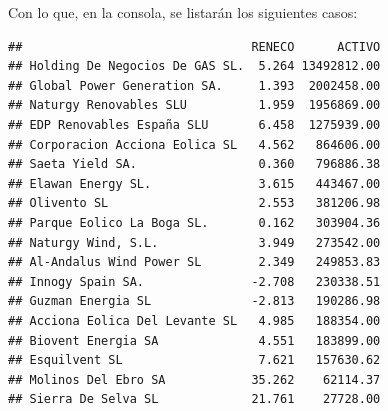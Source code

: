\documentclass[
]{book}
\newenvironment{Shaded}{\begin{snugshade}}{\end{snugshade}}
\newcommand{\FloatTok}[1]{\textcolor[rgb]{0.00,0.00,0.81}{#1}}
\newcommand{\FunctionTok}[1]{\textcolor[rgb]{0.13,0.29,0.53}{\textbf{#1}}}
\newcommand{\NormalTok}[1]{#1}
\newcommand{\OtherTok}[1]{\textcolor[rgb]{0.56,0.35,0.01}{#1}}
\newcommand{\SpecialCharTok}[1]{\textcolor[rgb]{0.81,0.36,0.00}{\textbf{#1}}}
\begin{document}
\begin{Shaded}
\end{Shaded}

Con lo que, en la consola, se listarán los siguientes casos:

\begin{verbatim}
##                                RENECO      ACTIVO
## Holding De Negocios De GAS SL.  5.264 13492812.00
## Global Power Generation SA.     1.393  2002458.00
## Naturgy Renovables SLU          1.959  1956869.00
## EDP Renovables España SLU       6.458  1275939.00
## Corporacion Acciona Eolica SL   4.562   864606.00
## Saeta Yield SA.                 0.360   796886.38
## Elawan Energy SL.               3.615   443467.00
## Olivento SL                     2.553   381206.98
## Parque Eolico La Boga SL.       0.162   303904.36
## Naturgy Wind, S.L.              3.949   273542.00
## Al-Andalus Wind Power SL        2.349   249853.83
## Innogy Spain SA.               -2.708   230338.51
## Guzman Energia SL              -2.813   190286.98
## Acciona Eolica Del Levante SL   4.985   188354.00
## Biovent Energia SA              4.551   183899.00
## Esquilvent SL                   7.621   157630.62
## Molinos Del Ebro SA            35.262    62114.37
## Sierra De Selva SL             21.761    27728.00
\end{verbatim}
\end{document}
